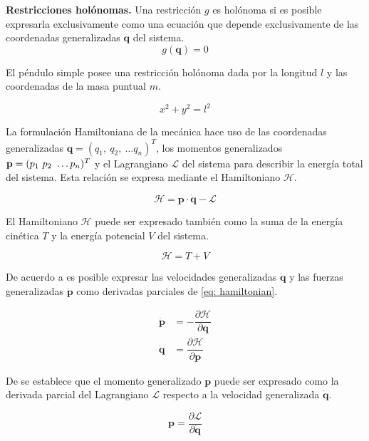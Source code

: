 \textbf{Restricciones holónomas.} Una restricción $g$ es holónoma si es posible 
expresarla exclusivamente como una ecuación que depende exclusivamente de 
las coordenadas generalizadas $\mathbf q$ del sistema.
\begin{equation}
 g(\mathbf q) = 0
\end{equation}

El péndulo simple posee una restricción holónoma dada por la longitud $l$
y las coordenadas de la masa puntual $m$.

\begin{equation}
 x^2 + y^2 = l^2
 \label{eq: holonomic constraint}
\end{equation}


La formulación Hamiltoniana de la mecánica hace uso de las coordenadas 
generalizadas $\mathbf q = (q_1, \ q_2, \ \dots q_n)^T$, 
los momentos generalizados $\bold p = (p_1 \ p_2 \ \dots p_n)^T$ 
y el Lagrangiano $\mathcal L$ del sistema para describir la energía total del sistema. 
Esta relación se expresa mediante el Hamiltoniano $\mathcal H$. 

\begin{equation}
 \mathcal H = \mathbf p \cdot \mathbf {\dot q} - \mathcal L
 \label{eq: hamiltonian}
\end{equation}

El Hamiltoniano $\mathcal H$ puede ser expresado también como la 
suma de la energía cinética $T$ y la energía  potencial $V$
del sistema.

\begin{equation}
 \mathcal H = T + V
\end{equation}

De acuerdo a \cite{susskind2014theoretical} es posible expresar las velocidades
generalizadas $\mathbf{\dot q}$ y las fuerzas generalizadas $\mathbf{\dot p}$ como 
derivadas parciales de \eqref{eq: hamiltonian}.

\begin{subequations}
 \begin{align}
  \mathbf{\dot p} & = - \dfrac{\partial \mathcal H}{\partial \mathbf q}\\
  \mathbf{\dot q} & = \dfrac{\partial \mathcal H}{\partial \mathbf p}
 \end{align}
\end{subequations}

De \cite{Montague:399399} se establece que el momento generalizado $\mathbf p$
puede ser expresado como la derivada parcial del Lagrangiano $\mathcal L$ respecto a
la velocidad generalizada $\mathbf {\dot q}$.

\begin{equation}
 \mathbf p = \dfrac{\partial \mathcal L}{\partial \mathbf{\dot q}}
 \label{eq: generalized momentum}
\end{equation}










